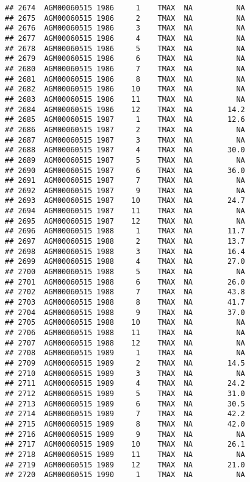 \documentclass{article}\usepackage[]{graphicx}\usepackage[]{color}
\makeatletter
\newenvironment{kframe}{%
 \def\at@end@of@kframe{}%
 \ifinner\ifhmode%
  \def\at@end@of@kframe{\end{minipage}}%
  \begin{minipage}{\columnwidth}%
 \fi\fi%
 \def\FrameCommand##1{\hskip\@totalleftmargin \hskip-\fboxsep
 \colorbox{shadecolor}{##1}\hskip-\fboxsep
     \hskip-\linewidth \hskip-\@totalleftmargin \hskip\columnwidth}%
 \MakeFramed {\advance\hsize-\width
   \@totalleftmargin\z@ \linewidth\hsize
   \@setminipage}}%
 {\par\unskip\endMakeFramed%
 \at@end@of@kframe}
\newenvironment{knitrout}{}{} %
\makeatother
\begin{document}
\begin{knitrout}
\begin{kframe}
\begin{verbatim}
## 2674  AGM00060515 1986     1    TMAX  NA          NA
## 2675  AGM00060515 1986     2    TMAX  NA          NA
## 2676  AGM00060515 1986     3    TMAX  NA          NA
## 2677  AGM00060515 1986     4    TMAX  NA          NA
## 2678  AGM00060515 1986     5    TMAX  NA          NA
## 2679  AGM00060515 1986     6    TMAX  NA          NA
## 2680  AGM00060515 1986     7    TMAX  NA          NA
## 2681  AGM00060515 1986     8    TMAX  NA          NA
## 2682  AGM00060515 1986    10    TMAX  NA          NA
## 2683  AGM00060515 1986    11    TMAX  NA          NA
## 2684  AGM00060515 1986    12    TMAX  NA        14.2
## 2685  AGM00060515 1987     1    TMAX  NA        12.6
## 2686  AGM00060515 1987     2    TMAX  NA          NA
## 2687  AGM00060515 1987     3    TMAX  NA          NA
## 2688  AGM00060515 1987     4    TMAX  NA        30.0
## 2689  AGM00060515 1987     5    TMAX  NA          NA
## 2690  AGM00060515 1987     6    TMAX  NA        36.0
## 2691  AGM00060515 1987     7    TMAX  NA          NA
## 2692  AGM00060515 1987     9    TMAX  NA          NA
## 2693  AGM00060515 1987    10    TMAX  NA        24.7
## 2694  AGM00060515 1987    11    TMAX  NA          NA
## 2695  AGM00060515 1987    12    TMAX  NA          NA
## 2696  AGM00060515 1988     1    TMAX  NA        11.7
## 2697  AGM00060515 1988     2    TMAX  NA        13.7
## 2698  AGM00060515 1988     3    TMAX  NA        16.4
## 2699  AGM00060515 1988     4    TMAX  NA        27.0
## 2700  AGM00060515 1988     5    TMAX  NA          NA
## 2701  AGM00060515 1988     6    TMAX  NA        26.0
## 2702  AGM00060515 1988     7    TMAX  NA        43.8
## 2703  AGM00060515 1988     8    TMAX  NA        41.7
## 2704  AGM00060515 1988     9    TMAX  NA        37.0
## 2705  AGM00060515 1988    10    TMAX  NA          NA
## 2706  AGM00060515 1988    11    TMAX  NA          NA
## 2707  AGM00060515 1988    12    TMAX  NA          NA
## 2708  AGM00060515 1989     1    TMAX  NA          NA
## 2709  AGM00060515 1989     2    TMAX  NA        14.5
## 2710  AGM00060515 1989     3    TMAX  NA          NA
## 2711  AGM00060515 1989     4    TMAX  NA        24.2
## 2712  AGM00060515 1989     5    TMAX  NA        31.0
## 2713  AGM00060515 1989     6    TMAX  NA        30.5
## 2714  AGM00060515 1989     7    TMAX  NA        42.2
## 2715  AGM00060515 1989     8    TMAX  NA        42.0
## 2716  AGM00060515 1989     9    TMAX  NA          NA
## 2717  AGM00060515 1989    10    TMAX  NA        26.1
## 2718  AGM00060515 1989    11    TMAX  NA          NA
## 2719  AGM00060515 1989    12    TMAX  NA        21.0
## 2720  AGM00060515 1990     1    TMAX  NA          NA

\end{verbatim}
\end{kframe}
\end{knitrout}
\end{document}
